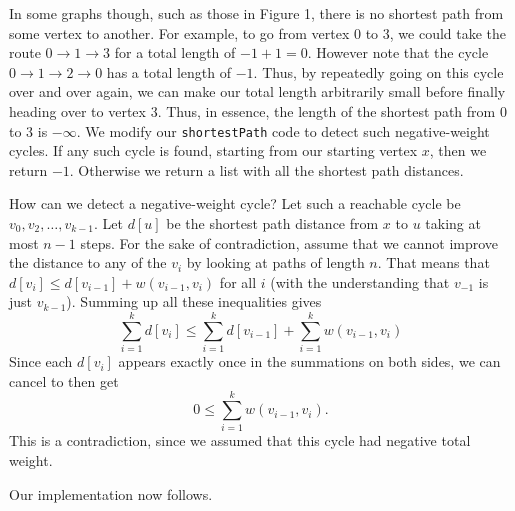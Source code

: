 \documentclass[11pt]{article}
\begin{document}
In some graphs though, such as those in Figure 1, there is no shortest
path from some vertex to another.  For example, to go from vertex $0$
to $3$, we could take the route $0\rightarrow 1\rightarrow 3$ for a
total length of $-1+1=0$.  However note that the cycle $0\rightarrow
1\rightarrow 2\rightarrow 0$ has a total length of $-1$.  Thus, by
repeatedly going on this cycle over and over again, we can make our
total length arbitrarily small before finally heading over to vertex
$3$.  Thus, in essence, the length of the shortest path from $0$ to
$3$ is $-\infty$.  We modify our \texttt{shortestPath} code to detect
such negative-weight cycles.  If any such cycle is found, starting
from our starting
vertex $x$, then we return $-1$.  Otherwise we return a list with all
the shortest path distances.

How can we detect a negative-weight cycle?  Let such a reachable cycle
be $v_0,v_2,\ldots,v_{k-1}$.  Let $d[u]$ be the shortest path distance
from $x$ to $u$ taking at most $n-1$ steps.  For the sake of
contradiction, assume that we cannot improve the distance to any of
the $v_i$ by looking at paths of length $n$.  That means that $d[v_i]
\le d[v_{i-1}] + w(v_{i-1}, v_i)$ for all $i$ (with the understanding
that $v_{-1}$ is just $v_{k-1}$).  Summing up all these inequalities
gives
$$ \sum_{i=1}^k d[v_i] \le \sum_{i=1}^k d[v_{i-1}] + \sum_{i=1}^k
w(v_{i-1}, v_i)$$
Since each $d[v_i]$ appears exactly once in the summations on
both sides, we can cancel to then get
$$ 0 \le \sum_{i=1}^k w(v_{i-1}, v_i) .$$
This is a contradiction, since we assumed that this cycle had negative
total weight.

Our implementation now follows.
\end{document}
